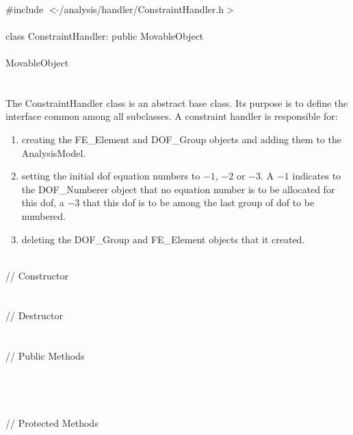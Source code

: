 
   \\
\indent \#include $<\tilde{ }$/analysis/handler/ConstraintHandler.h$>$  \\

  \\
\indent class ConstraintHandler: public MovableObject  \\

 \\
\indent MovableObject \\
\indent{} \\

 \\ 
\indent The ConstraintHandler class is an abstract base class. Its purpose is
to define the interface common among all subclasses.  A constraint
handler is responsible for: \begin{enumerate} \item creating the
FE\_Element and DOF\_Group objects and adding them to the
AnalysisModel. \item setting the initial dof equation numbers to $-1$,
$-2$ or $-3$. A $-1$ indicates to the DOF\_Numberer object that no
equation number is to be allocated for this dof, a $-3$ that this dof
is to be among the last group of dof to be numbered. \item deleting
the DOF\_Group and FE\_Element objects that it created.\end{enumerate}


 \\
\indent // Constructor \\
\\  \\
\indent // Destructor \\
\\  \\
\indent // Public Methods\\
 \\
 \\ 
 \\ \\
\indent // Protected Methods  \\
 \\
 \\
 \\


